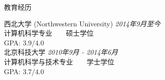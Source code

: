 \documentclass{resume} %
\begin{document}

\begin{rSection}{教育经历}

{\large 西北大学 (Northwestern University)} \hfill {\em 2014年9月至今} \\ 
计算机科学专业~~~~硕士学位 \\
GPA: 3.9/4.0\\[0.5em]
{\large 北京科技大学} \hfill {\em 2010年9月 - 2014年6月} \\ 
计算机科学与技术专业~~~~学士学位 \\
GPA: 3.7/4.0
\end{rSection}

\end{document}
